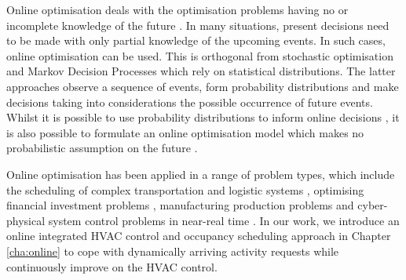 


Online optimisation deals with the optimisation problems having no or incomplete knowledge of the future \citep{jaillet2012online}. In many situations, present decisions need to be made with only partial knowledge of the upcoming events. In such cases, online optimisation can be used. This is orthogonal from stochastic optimisation and Markov Decision Processes which rely on statistical distributions. The latter approaches observe a sequence of events, form probability distributions and make decisions taking into considerations the possible occurrence of future events. Whilst it is possible to use probability distributions to inform online decisions \citep{hentenryck2009online}, it is also possible to formulate an online optimisation model which makes no probabilistic assumption on the future \citep{bubeck2011introduction}. 

Online optimisation has been applied in a range of problem types, which include the scheduling of complex transportation and logistic systems \citep{golden2008vehicle}, optimising financial investment problems \citep{mulvey2004financial}, manufacturing production problems \citep{hatono1991modeling} and cyber-physical system control problems in near-real time \citep{wang2010fast,jost2013accelerating}. In our work, we introduce an online integrated HVAC control and occupancy scheduling approach in Chapter \ref{cha:online} to cope with dynamically arriving activity requests while continuously improve on the HVAC control. 

